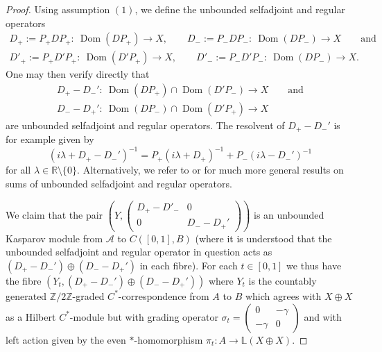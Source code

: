 \documentclass[pdftex]{sigma}
\numberwithin{equation}{section}
\newcommand{\op}{\oplus}
\newcommand{\zz}{\mathbb{Z}}
\newcommand{\ga}{\gamma}
\newcommand{\la}{\lambda}
\newcommand{\si}{\sigma}
\newcommand{\s}[1]{\mathscr{#1}}
\newcommand{\B}[1]{\mathbb{#1}}
\newcommand{\sem}{\setminus}
\begin{document}
\begin{proof}
Using assumption $(1)$, we define the unbounded selfadjoint and regular operators
\begin{gather*}
D_+ := P_+ D P_+\colon \ \operatorname{Dom}(D P_+) \to X , \qquad D_- := P_- D P_-\colon \ \operatorname{Dom}(D P_-) \to X \qquad \text{and} \\
D'_+ := P_+ D' P_+\colon \ \operatorname{Dom}(D' P_+) \to X , \qquad D'_- := P_- D' P_-\colon \ \operatorname{Dom}(D P_-) \to X .
\end{gather*}
One may then verify directly that
\begin{gather*}
 D_+ - D_-'\colon \ \operatorname{Dom}(D P_+) \cap \operatorname{Dom}(D' P_-) \to X \qquad \text{and} \\
 D_- - D_+'\colon \ \operatorname{Dom}(D P_-) \cap \operatorname{Dom}(D' P_+) \to X
\end{gather*}
are unbounded selfadjoint and regular operators. The resolvent of $D_+ - D_-'$ is for example given by
\[
(i \la + D_+ - D_-')^{-1} = P_+ ( i \la + D_+)^{-1} + P_- (i\la - D_-')^{-1}
\]
for all $\la \in \B R \sem \{0\}$. Alternatively, we refer to \cite[Section~7]{KaLe:LGR} or \cite[Theorem~4.5]{LeMe:SSH} for much more general results on sums of unbounded selfadjoint and regular operators.

We claim that the pair $\left(Y, \left(\begin{smallmatrix} D_+ - D'_- & 0 \\ 0 & D_- - D_+' \end{smallmatrix}\right)\right)$ is an unbounded Kasparov module from $\s A$ to $C( [0,1], B)$ (where it is understood that the unbounded selfadjoint and regular operator in question acts as $( D_+ - D_-') \op (D_- - D_+')$ in each fibre). For each $t \in [0,1]$ we thus have the fibre $(Y_t, ( D_+ - D_-') \op (D_- - D_+'))$ where $Y_t$ is the countably generated $\zz/2\zz$-graded $C^*$-correspondence from $A$ to $B$ which agrees with $X \op X$ as a Hilbert $C^*$-module but with grading operator $\si_t = \left(\begin{smallmatrix}0 & -\ga \\ -\ga & 0\end{smallmatrix}\right)$ and with left action given by the even $*$-homomorphism $\pi_t\colon A \to \B L(X \op X)$.


\end{proof}
\end{document}
